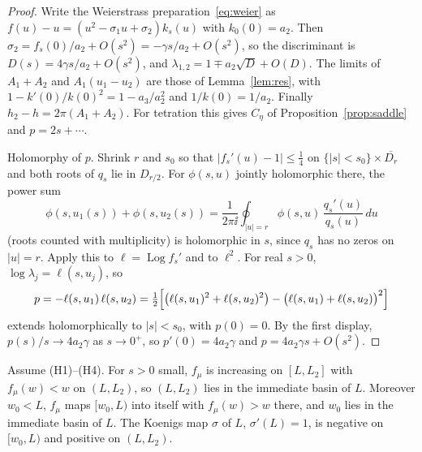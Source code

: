 \begin{proof}
Write the Weierstrass preparation~\eqref{eq:weier} as
$f(u)-u=(u^2-\sigma_1u+\sigma_2)k_s(u)$ with $k_0(0)=a_2$.  Then
$\sigma_2=f_s(0)/a_2+O(s^2)=-\gamma s/a_2+O(s^2)$, so the discriminant is
$D(s)=4\gamma s/a_2+O(s^2)$, and $\lambda_{1,2}=1\mp a_2\sqrt D+O(D)$.  The
limits of $A_1+A_2$ and $A_1(u_1-u_2)$ are those of Lemma~\ref{lem:res}, with
$1-k'(0)/k(0)^2=1-a_3/a_2^2$ and $1/k(0)=1/a_2$.  Finally
$h_2-h=2\pi(A_1+A_2)$.  For tetration this gives $C_\eta$ of
Proposition~\ref{prop:saddle} and $p=2s+\cdots$.

Holomorphy of $p$.  Shrink $r$ and $s_0$ so that $|f_s'(u)-1|\le\tfrac14$ on
$\{|s|<s_0\}\times\overline{D_r}$ and both roots of $q_s$ lie in $D_{r/2}$.
For $\phi(s,u)$ jointly holomorphic there, the power sum
\[
 \phi(s,u_1(s))+\phi(s,u_2(s))=\frac1{2\pi\ii}\oint_{|u|=r}\phi(s,u)\,
 \frac{q_s'(u)}{q_s(u)}\,du
\]
(roots counted with multiplicity) is holomorphic in $s$, since $q_s$ has no
zeros on $|u|=r$.  Apply this to $\ell=\operatorname{Log}f_s'$ and to $\ell^2$.
For real $s>0$, $\log\lambda_j=\ell(s,u_j)$, so
\[
 p=-\ell(s,u_1)\,\ell(s,u_2)
 =\tfrac12\Bigl[\bigl(\ell(s,u_1)^2+\ell(s,u_2)^2\bigr)-\bigl(\ell(s,u_1)+\ell(s,u_2)\bigr)^2\Bigr]
\]
extends holomorphically to $|s|<s_0$, with $p(0)=0$.  By the first display,
$p(s)/s\to4a_2\gamma$ as $s\to0^+$, so $p'(0)=4a_2\gamma$ and
$p=4a_2\gamma s+O(s^2)$.
\end{proof}

\begin{lemma}\label{lem:gen-real}
Assume \textup{(H1)--(H4)}.  For $s>0$ small, $f_\mu$ is increasing on
$[L,L_2]$ with $f_\mu(w)<w$ on $(L,L_2)$, so $(L,L_2)$ lies in the immediate
basin of $L$.  Moreover $w_0<L$, $f_\mu$ maps $[w_0,L)$ into itself with
$f_\mu(w)>w$ there, and $w_0$ lies in the immediate basin of $L$.  The Koenigs
map $\sigma$ of $L$, $\sigma'(L)=1$, is negative on $[w_0,L)$ and positive on
$(L,L_2)$.
\end{lemma}


